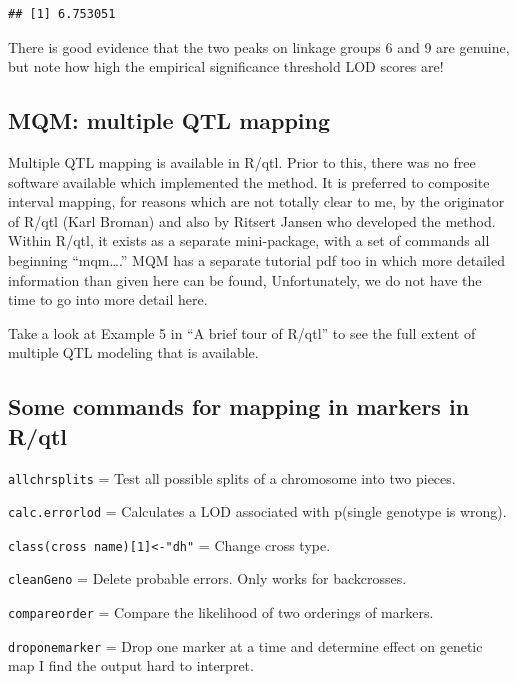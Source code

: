 \documentclass[
]{book}
\begin{document}
\begin{verbatim}
## [1] 6.753051
\end{verbatim}

There is good evidence that the two peaks on linkage groups 6 and 9 are genuine, but note how high the empirical significance threshold LOD scores are!

\hypertarget{mqm-multiple-qtl-mapping}{%
\subsection{MQM: multiple QTL mapping}\label{mqm-multiple-qtl-mapping}}

Multiple QTL mapping is available in R/qtl. Prior to this, there was no free software available which implemented the method. It is preferred to composite interval mapping, for reasons which are not totally clear to me, by the originator of R/qtl (Karl Broman) and also by Ritsert Jansen who developed the method. Within R/qtl, it exists as a separate mini-package, with a set of commands all beginning ``mqm\ldots.'' MQM has a separate tutorial pdf too in which more detailed information than given here can be found, Unfortunately, we do not have the time to go into more detail here.

Take a look at Example 5 in ``A brief tour of R/qtl'' to see the full extent of multiple QTL modeling that is available.

\hypertarget{some-commands-for-mapping-in-markers-in-rqtl}{%
\subsection{Some commands for mapping in markers in R/qtl}\label{some-commands-for-mapping-in-markers-in-rqtl}}

\texttt{allchrsplits} = Test all possible splits of a chromosome into two pieces.

\texttt{calc.errorlod} = Calculates a LOD associated with p(single genotype is wrong).

\texttt{class(cross\ name){[}1{]}\textless{}-"dh"} = Change cross type.

\texttt{cleanGeno} = Delete probable errors. Only works for backcrosses.

\texttt{compareorder} = Compare the likelihood of two orderings of markers.

\texttt{droponemarker} = Drop one marker at a time and determine effect on genetic map I find the output hard to interpret.
\end{document}

